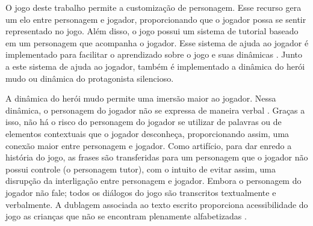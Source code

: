\vspace{-0.1cm}

O jogo deste trabalho permite a customização de personagem. Esse recurso gera um elo entre personagem e jogador, proporcionando que o jogador possa se sentir representado no jogo. Além disso, o jogo possui um sistema de tutorial baseado em um personagem que acompanha o jogador. Esse sistema de ajuda ao jogador é implementado para facilitar o aprendizado sobre o jogo e suas dinâmicas \cite{buchinger2014sherlock}. Junto a este sistema de ajuda ao jogador, também é implementado a dinâmica do herói mudo ou dinâmica do protagonista silencioso. 

\vspace{-0.1cm}

A dinâmica do herói mudo permite uma imersão maior ao jogador. Nessa dinâmica, o personagem do jogador não se expressa de maneira verbal \cite{domsch2017dialogue}. Graças a isso, não há o risco do personagem do jogador se utilizar de palavras ou de elementos contextuais que o jogador desconheça, proporcionando assim, uma conexão maior entre personagem e jogador. Como artifício, para dar enredo a história do jogo, as frases são transferidas para um personagem que o jogador não possui controle (o personagem tutor), com o intuito de evitar assim, uma disrupção da interligação entre personagem e jogador. Embora o personagem do jogador não fale; todos os diálogos do jogo são transcritos textualmente e verbalmente. A dublagem associada ao texto escrito proporciona acessibilidade do jogo as crianças que não se encontram plenamente alfabetizadas \cite{limeira2015avaliaccao}. 

\vspace{-0.1cm}



